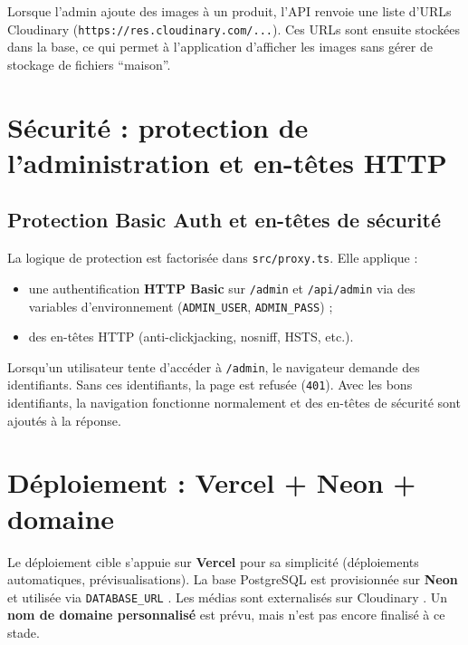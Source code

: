 Lorsque l’admin ajoute des images à un produit, l’API renvoie une liste d’URLs Cloudinary (\texttt{https://res.cloudinary.com/...}). Ces URLs sont ensuite stockées dans la base, ce qui permet à l’application d’afficher les images sans gérer de stockage de fichiers “maison”.

\section{Sécurité : protection de l’administration et en-têtes HTTP}

\subsection{Protection Basic Auth et en-têtes de sécurité}
La logique de protection est factorisée dans \texttt{src/proxy.ts}. Elle applique :
\begin{itemize}
    \item une authentification \textbf{HTTP Basic} sur \texttt{/admin} et \texttt{/api/admin} via des variables d’environnement (\texttt{ADMIN\_USER}, \texttt{ADMIN\_PASS}) ;
    \item des en-têtes HTTP (anti-clickjacking, nosniff, HSTS, etc.).
\end{itemize}

Lorsqu’un utilisateur tente d’accéder à \texttt{/admin}, le navigateur demande des identifiants. Sans ces identifiants, la page est refusée (\texttt{401}). Avec les bons identifiants, la navigation fonctionne normalement et des en-têtes de sécurité sont ajoutés à la réponse.

\section{Déploiement : Vercel + Neon + domaine}
Le déploiement cible s’appuie sur \textbf{Vercel} pour sa simplicité (déploiements automatiques, prévisualisations). La base PostgreSQL est provisionnée sur \textbf{Neon} et utilisée via \texttt{DATABASE\_URL} \cite{neonDocs}. Les médias sont externalisés sur Cloudinary \cite{cloudinaryDocs}. Un \textbf{nom de domaine personnalisé} est prévu, mais n’est pas encore finalisé à ce stade.